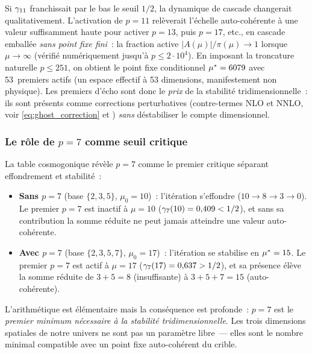 \documentclass[12pt,a4paper]{article}
\begin{document}
\begin{remarque}
\label{rem:firewall}
Si $\gamma_{11}$ franchissait par le bas le seuil $1/2$, la dynamique
de cascade changerait qualitativement. L'activation de $p = 11$
relèverait l'échelle auto-cohérente à une valeur suffisamment haute
pour activer $p = 13$, puis $p = 17$, etc., en cascade emballée
\emph{sans point fixe fini}~: la fraction active
$|A(\mu)|/\pi(\mu) \to 1$ lorsque $\mu \to \infty$ (vérifié
numériquement jusqu'à $p \leq 2 \cdot 10^4$). En imposant la
troncature naturelle $p \leq 251$, on obtient le point fixe
conditionnel ${\mu^{*}} = 6079$ avec 53~premiers actifs (un espace
effectif à 53 dimensions, manifestement non physique). Les premiers
d'écho sont donc le \emph{prix} de la stabilité tridimensionnelle~:
ils sont présents comme corrections perturbatives (contre-termes
NLO et NNLO, voir \eqref{eq:ghost_correction} et
\cite{companion_physics}) \emph{sans} déstabiliser le compte
dimensionnel.
\end{remarque}

\subsubsection{Le rôle de $p = 7$ comme seuil critique}
\label{sec:ch8_p7_threshold}

La table cosmogonique révèle $p = 7$ comme le premier critique
séparant effondrement et stabilité~:

\begin{itemize}[nosep]
\item \textbf{Sans $p = 7$} (base $\{2,3,5\}$, $\mu_0 = 10$)~:
  l'itération s'effondre ($10 \to 8 \to 3 \to 0$). Le premier $p = 7$
  est inactif à $\mu = 10$ ($\gamma_{7}(10) = 0{,}409 < 1/2$), et sans
  sa contribution la somme réduite ne peut jamais atteindre une
  valeur auto-cohérente.
\item \textbf{Avec $p = 7$} (base $\{2,3,5,7\}$, $\mu_0 = 17$)~:
  l'itération se stabilise en ${\mu^{*}} = 15$. Le premier $p = 7$ est
  actif à $\mu = 17$ ($\gamma_{7}(17) = 0{,}637 > 1/2$), et sa présence
  élève la somme réduite de $3 + 5 = 8$ (insuffisante) à
  $3 + 5 + 7 = 15$ (auto-cohérente).
\end{itemize}

L'arithmétique est élémentaire mais la conséquence est profonde~:
$p = 7$ est le \emph{premier minimum nécessaire à la stabilité
tridimensionnelle}. Les trois dimensions spatiales de notre univers
ne sont pas un paramètre libre~--- elles sont le nombre minimal
compatible avec un point fixe auto-cohérent du crible.
\end{document}

